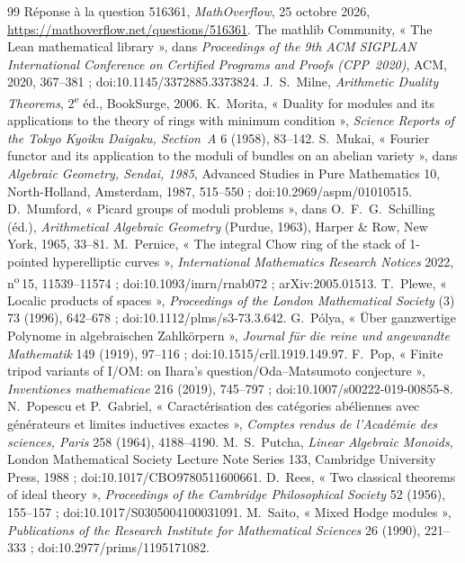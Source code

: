 \documentclass[11pt]{article}
\theoremstyle{plain}
\theoremstyle{definition}
\theoremstyle{plain}
\theoremstyle{definition}
\theoremstyle{remark}
\renewcommand{\_}{\bkunderscore\allowbreak}
\begin{document}
\begin{thebibliography}{99}
 Réponse à la question 516361, \emph{MathOverflow}, 25 octobre 2026, \url{https://mathoverflow.net/questions/516361}.
 The mathlib Community, « The Lean mathematical library », dans \emph{Proceedings of the 9th ACM SIGPLAN International Conference on Certified Programs and Proofs (CPP~2020)}, ACM, 2020, 367--381 ; doi:10.1145/3372885.3373824.
 J.~S.~Milne, \emph{Arithmetic Duality Theorems}, 2\textsuperscript{e} éd., BookSurge, 2006.
 K.~Morita, « Duality for modules and its applications to the theory of rings with minimum condition », \emph{Science Reports of the Tokyo Kyoiku Daigaku, Section~A} 6 (1958), 83--142.
 S.~Mukai, « Fourier functor and its application to the moduli of bundles on an abelian variety », dans \emph{Algebraic Geometry, Sendai, 1985}, Advanced Studies in Pure Mathematics 10, North-Holland, Amsterdam, 1987, 515--550 ; doi:10.2969/aspm/01010515.
 D.~Mumford, « Picard groups of moduli problems », dans O.~F.~G.~Schilling (éd.), \emph{Arithmetical Algebraic Geometry} (Purdue, 1963), Harper \& Row, New York, 1965, 33--81.
 M.~Pernice, « The integral Chow ring of the stack of 1-pointed hyperelliptic curves », \emph{International Mathematics Research Notices} 2022, n\textsuperscript{o}\,15, 11539--11574 ; doi:10.1093/imrn/rnab072 ; arXiv:2005.01513.
 T.~Plewe, « Localic products of spaces », \emph{Proceedings of the London Mathematical Society} (3) 73 (1996), 642--678 ; doi:10.1112/plms/s3-73.3.642.
 G.~Pólya, « Über ganzwertige Polynome in algebraischen Zahlkörpern », \emph{Journal für die reine und angewandte Mathematik} 149 (1919), 97--116 ; doi:10.1515/crll.1919.149.97.
 F.~Pop, « Finite tripod variants of I/OM: on Ihara's question/Oda--Matsumoto conjecture », \emph{Inventiones mathematicae} 216 (2019), 745--797 ; doi:10.1007/s00222-019-00855-8.
 N.~Popescu et P.~Gabriel, « Caractérisation des catégories abéliennes avec générateurs et limites inductives exactes », \emph{Comptes rendus de l'Académie des sciences, Paris} 258 (1964), 4188--4190.
 M.~S.~Putcha, \emph{Linear Algebraic Monoids}, London Mathematical Society Lecture Note Series 133, Cambridge University Press, 1988 ; doi:10.1017/CBO9780511600661.
 D.~Rees, « Two classical theorems of ideal theory », \emph{Proceedings of the Cambridge Philosophical Society} 52 (1956), 155--157 ; doi:10.1017/S0305004100031091.
 M.~Saito, « Mixed Hodge modules », \emph{Publications of the Research Institute for Mathematical Sciences} 26 (1990), 221--333 ; doi:10.2977/prims/1195171082.

\end{thebibliography}
\end{document}
